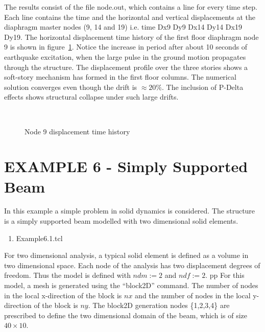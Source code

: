 \documentclass[12pt]{article}
\begin{document}
\vspace{0.2in} 

The results consist of the file node.out, which contains a line for
every time step. Each line contains the time and the horizontal and
vertical displacements at the diaphragm master nodes (9, 14 and 19)
i.e. time Dx9 Dy9 Dx14 Dy14 Dx19 Dy19. The horizontal displacement
time history of the first floor diaphragm node 9 is shown in
figure~\ref{example4disp}. Notice the increase in period
after about 10 seconds of earthquake excitation, when the large pulse
in the ground motion propagates through the structure. The
displacement profile over the three stories shows a soft-story
mechanism has formed in the first floor columns. The numerical
solution converges even though the drift is
$\approx 20 \%$. The inclusion of P-Delta effects shows
structural collapse under such large drifts.

\begin{figure}[h]
\begin{center}
\leavevmode
\hbox{%
\epsfxsize=4.0in
\epsfysize=2.8in
}
\end{center}
\caption{Node 9 displacement time history}
\label{example4disp}
\end{figure}


\clearpage
\section {EXAMPLE 6 - Simply Supported Beam}

In this example a simple problem in solid dynamics is considered.
The structure is a simply supported beam modelled with two dimensional
solid elements.

\vspace{0.2in}  
\begin{enumerate} 
\item Example6.1.tcl
\end{enumerate}

\vspace{0.2in} 

For two dimensional analysis, a typical solid element is defined as a volume 
in two dimensional space.  Each node of the analysis has two displacement
degrees of freedom.  Thus the model is defined with 
$ndm := 2$ and $ndf := 2$.
pp
For this model, a mesh is generated using the ``block2D'' command.  The number of 
nodes in the local x-direction of the block is $nx$ and
the number of nodes in the local y-direction of the block is $ny$.
The block2D generation nodes \{1,2,3,4\} are prescribed to define 
the two dimensional domain of the beam, which is of size $40\times10$.
\end{document}
